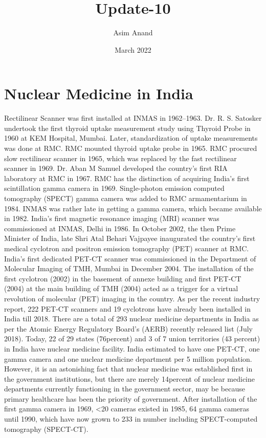 \documentclass{article}
\title{Update-10}
\author{Asim Anand}
\date{March 2022}
\begin{document}
\maketitle

\section{Nuclear Medicine in India}
Rectilinear Scanner was first installed at INMAS in 1962–1963. Dr. R. S. Satosker undertook the first thyroid uptake measurement study using Thyroid Probe in 1960 at KEM Hospital, Mumbai. Later, standardization of uptake measurements was done at RMC. RMC mounted thyroid uptake probe in 1965. RMC procured slow rectilinear scanner in 1965, which was replaced by the fast rectilinear scanner in 1969. Dr. Aban M Samuel developed the country's first RIA laboratory at RMC in 1967. RMC has the distinction of acquiring India's first scintillation gamma camera in 1969. Single-photon emission computed tomography (SPECT) gamma camera was added to RMC armamentarium in 1984. INMAS was rather late in getting a gamma camera, which became available in 1982. India's first magnetic resonance imaging (MRI) scanner was commissioned at INMAS, Delhi in 1986. In October 2002, the then Prime Minister of India, late Shri Atal Behari Vajpayee inaugurated the country's first medical cyclotron and positron emission tomography (PET) scanner at RMC. India's first dedicated PET-CT scanner was commissioned in the Department of Molecular Imaging of TMH, Mumbai in December 2004. The installation of the first cyclotron (2002) in the basement of annexe building and first PET-CT (2004) at the main building of TMH (2004) acted as a trigger for a virtual revolution of molecular (PET) imaging in the country. As per the recent industry report, 222 PET-CT scanners and 19 cyclotrons have already been installed in India till 2018. There are a total of 293 nuclear medicine departments in India as per the Atomic Energy Regulatory Board's (AERB) recently released list (July 2018). Today, 22 of 29 states (76percent) and 3 of 7 union territories (43 percent) in India have nuclear medicine facility. India estimated to have one PET-CT, one gamma camera and one nuclear medicine department per 5 million population. However, it is an astonishing fact that nuclear medicine was established first in the government institutions, but there are merely 14percent of nuclear medicine departments currently functioning in the government sector, may be because primary healthcare has been the priority of government. After installation of the first gamma camera in 1969, <20 cameras existed in 1985, 64 gamma cameras until 1990, which have now grown to 233 in number including SPECT-computed tomography (SPECT-CT).
\end{document}
